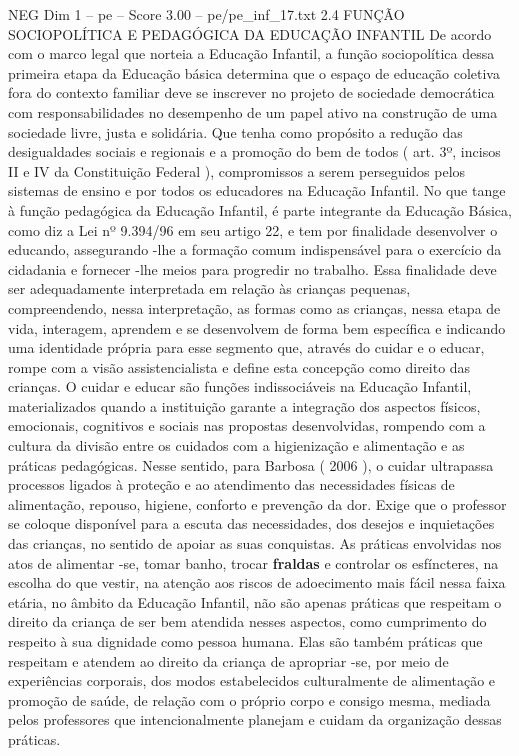 \begin{textsample}{NEG Dim 1 – pe – Score 3.00 – pe/pe\_inf\_17.txt}  \label{ex:f1_neg_048}
2.4 FUNÇÃO SOCIOPOLÍTICA E PEDAGÓGICA DA EDUCAÇÃO INFANTIL De acordo com o marco legal que norteia a Educação Infantil, a função sociopolítica dessa primeira etapa da Educação básica determina que o espaço de educação coletiva fora do contexto familiar deve se inscrever no projeto de sociedade democrática com responsabilidades no desempenho de um papel ativo na construção de uma sociedade livre, justa e solidária.
Que tenha como propósito a redução das desigualdades sociais e regionais e a promoção do bem de todos ( art. 3º, incisos II e IV da Constituição Federal ), compromissos a serem perseguidos pelos sistemas de ensino e por todos os educadores na Educação Infantil.
No que tange à função pedagógica da Educação Infantil, é parte integrante da Educação Básica, como diz a Lei nº 9.394/96 em seu artigo 22, e tem por finalidade desenvolver o educando, assegurando -lhe a formação comum indispensável para o exercício da cidadania e fornecer -lhe meios para progredir no trabalho.
Essa finalidade deve ser adequadamente interpretada em relação às crianças pequenas, compreendendo, nessa interpretação, as formas como as crianças, nessa etapa de vida, interagem, aprendem e se desenvolvem de forma bem específica e indicando uma identidade própria para esse segmento que, através do cuidar e o educar, rompe com a visão assistencialista e define esta concepção como direito das crianças.
O cuidar e educar são funções indissociáveis na Educação Infantil, materializados quando a instituição garante a integração dos aspectos físicos, emocionais, cognitivos e sociais nas propostas desenvolvidas, rompendo com a cultura da divisão entre os cuidados com a higienização e alimentação e as práticas pedagógicas.
Nesse sentido, para Barbosa ( 2006 ), o cuidar ultrapassa processos ligados à proteção e ao atendimento das necessidades físicas de alimentação, repouso, higiene, conforto e prevenção da dor.
Exige que o professor se coloque disponível para a escuta das necessidades, dos desejos e inquietações das crianças, no sentido de apoiar as suas conquistas.
As práticas envolvidas nos atos de alimentar -se, tomar banho, trocar \textbf{fraldas} e controlar os esfíncteres, na escolha do que vestir, na atenção aos riscos de adoecimento mais fácil nessa faixa etária, no âmbito da Educação Infantil, não são apenas práticas que respeitam o direito da criança de ser bem atendida nesses aspectos, como cumprimento do respeito à sua dignidade como pessoa humana.
Elas são também práticas que respeitam e atendem ao direito da criança de apropriar -se, por meio de experiências corporais, dos modos estabelecidos culturalmente de alimentação e promoção de saúde, de relação com o próprio corpo e consigo mesma, mediada pelos professores que intencionalmente planejam e cuidam da organização dessas práticas.

\end{textsample}
